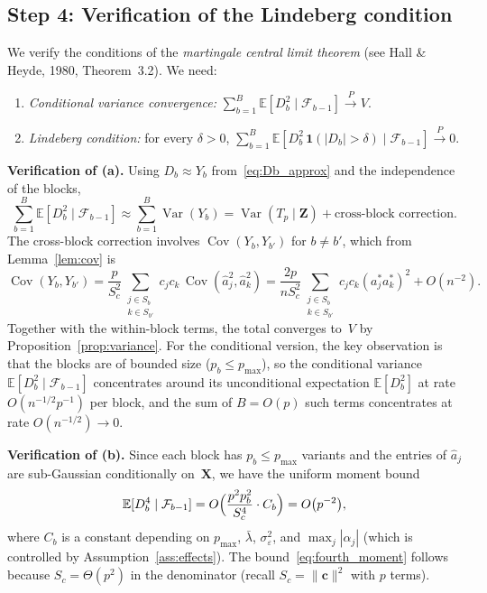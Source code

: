 \documentclass[11pt]{article}
\newcommand{\E}{\mathbb{E}}
\newcommand{\Var}{\operatorname{Var}}
\newcommand{\Cov}{\operatorname{Cov}}
\newcommand{\X}{\bm{X}}
\newcommand{\Z}{\bm{Z}}
\newcommand{\bc}{\bm{c}}
\begin{document}
\subsection*{Step 4: Verification of the Lindeberg condition}

We verify the conditions of the \emph{martingale central limit theorem} (see
Hall \& Heyde, 1980, Theorem~3.2).  We need:
\begin{enumerate}[label=(\alph*)]
\item \emph{Conditional variance convergence:}\;
  $\displaystyle\sum_{b=1}^{B}\E[D_b^{2}\mid\mathcal{F}_{b-1}]
  \xrightarrow{\;P\;}V$.

\item \emph{Lindeberg condition:}\; for every $\delta>0$,
  $\displaystyle\sum_{b=1}^{B}\E[D_b^{2}\,\mathbf{1}(|D_b|>\delta)
  \mid\mathcal{F}_{b-1}]\xrightarrow{\;P\;}0$.
\end{enumerate}

\medskip
\noindent\textbf{Verification of (a).}\;
Using $D_b\approx Y_b$ from~\eqref{eq:Db_approx} and the independence of the
blocks,
\[
  \sum_{b=1}^{B}\E[D_b^{2}\mid\mathcal{F}_{b-1}]
  \approx \sum_{b=1}^{B}\Var(Y_b)
  = \Var(T_p\mid\Z)+\text{cross-block correction}.
\]
The cross-block correction involves $\Cov(Y_b,Y_{b'})$ for $b\ne b'$, which
from Lemma~\ref{lem:cov} is
\[
  \Cov(Y_b,Y_{b'})
  = \frac{p}{S_c^{2}}\sum_{\substack{j\in S_b\\k\in S_{b'}}}c_jc_k
    \,\Cov(\hat{a}_j^{2},\hat{a}_k^{2})
  = \frac{2p}{nS_c^{2}}\sum_{\substack{j\in S_b\\k\in S_{b'}}}c_jc_k
    (a_j^{*}a_k^{*})^{2}+O(n^{-2}).
\]
Together with the within-block terms, the total converges to~$V$ by
Proposition~\ref{prop:variance}.  For the conditional version, the key
observation is that the blocks are of bounded size ($p_b\le p_{\max}$), so
the conditional variance $\E[D_b^{2}\mid\mathcal{F}_{b-1}]$ concentrates
around its unconditional expectation $\E[D_b^{2}]$ at rate
$O(n^{-1/2}p^{-1})$ per block, and the sum of $B=O(p)$ such terms
concentrates at rate $O(n^{-1/2})\to0$.

\medskip
\noindent\textbf{Verification of (b).}\;
Since each block has $p_b\le p_{\max}$ variants and the entries of
$\hat{a}_j$ are sub-Gaussian conditionally on~$\X$, we have the uniform
moment bound
\begin{equation}\label{eq:fourth_moment}
  \E[D_b^{4}\mid\mathcal{F}_{b-1}]
  = O\Bigl(\frac{p^{2}p_b^{2}}{S_c^{4}}\cdot C_b\Bigr)
  = O\bigl(p^{-2}\bigr),
\end{equation}
where $C_b$ is a constant depending on $p_{\max}$, $\bar\lambda$,
$\sigma_\varepsilon^{2}$, and $\max_j|\alpha_j|$ (which is controlled by
Assumption~\ref{ass:effects}).  The bound~\eqref{eq:fourth_moment} follows
because $S_c=\Theta(p^{2})$ in the denominator (recall $S_c=\|\bc\|^{2}$
with $p$ terms).
\end{document}
